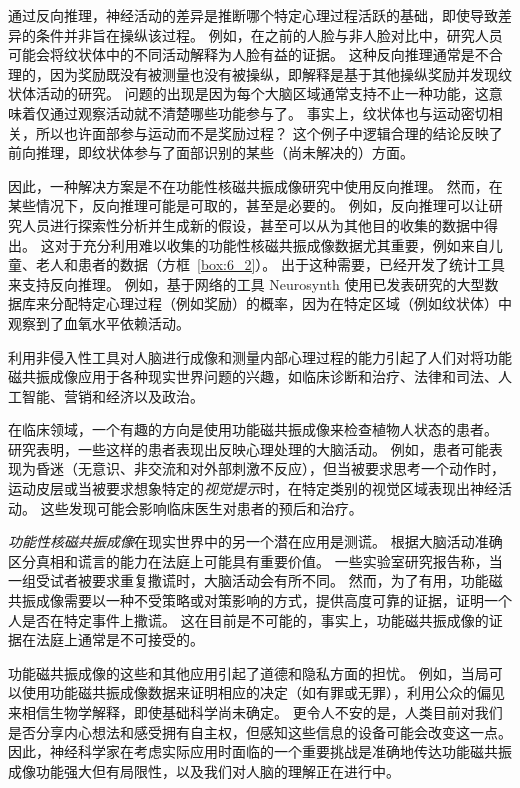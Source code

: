 通过反向推理，神经活动的差异是推断哪个特定心理过程活跃的基础，即使导致差异的条件并非旨在操纵该过程。 
例如，在之前的人脸与非人脸对比中，研究人员可能会将纹状体中的不同活动解释为人脸有益的证据。
这种反向推理通常是不合理的，因为奖励既没有被测量也没有被操纵，即解释是基于其他操纵奖励并发现纹状体活动的研究。
问题的出现是因为每个大脑区域通常支持不止一种功能，这意味着仅通过观察活动就不清楚哪些功能参与了。
事实上，纹状体也与运动密切相关，所以也许面部参与运动而不是奖励过程？
这个例子中逻辑合理的结论反映了前向推理，即纹状体参与了面部识别的某些（尚未解决的）方面。


因此，一种解决方案是不在功能性核磁共振成像研究中使用反向推理。
然而，在某些情况下，反向推理可能是可取的，甚至是必要的。
例如，反向推理可以让研究人员进行探索性分析并生成新的假设，甚至可以从为其他目的收集的数据中得出。
这对于充分利用难以收集的功能性核磁共振成像数据尤其重要，例如来自儿童、老人和患者的数据（方框~\ref{box:6_2}）。
出于这种需要，已经开发了统计工具来支持反向推理。
例如，基于网络的工具 Neurosynth 使用已发表研究的大型数据库来分配特定心理过程（例如奖励）的概率，因为在特定区域（例如纹状体）中观察到了血氧水平依赖活动。


\begin{proposition}[现实世界中的大脑成像] \label{box:6_2}
	
	\quad \quad 利用非侵入性工具对人脑进行成像和测量内部心理过程的能力引起了人们对将功能磁共振成像应用于各种现实世界问题的兴趣，如临床诊断和治疗、法律和司法、人工智能、营销和经济以及政治。
	
	\quad \quad 在临床领域，一个有趣的方向是使用功能磁共振成像来检查植物人状态的患者。
	研究表明，一些这样的患者表现出反映心理处理的大脑活动。
	例如，患者可能表现为昏迷（无意识、非交流和对外部刺激不反应），但当被要求思考一个动作时，运动皮层或当被要求想象特定的\textit{视觉提示}时，在特定类别的视觉区域表现出神经活动。
	这些发现可能会影响临床医生对患者的预后和治疗。
	
	\quad \quad \textit{功能性核磁共振成像}在现实世界中的另一个潜在应用是测谎。
	根据大脑活动准确区分真相和谎言的能力在法庭上可能具有重要价值。
	一些实验室研究报告称，当一组受试者被要求重复撒谎时，大脑活动会有所不同。
	然而，为了有用，功能磁共振成像需要以一种不受策略或对策影响的方式，提供高度可靠的证据，证明一个人是否在特定事件上撒谎。
	这在目前是不可能的，事实上，功能磁共振成像的证据在法庭上通常是不可接受的。
	
	\quad \quad 功能磁共振成像的这些和其他应用引起了道德和隐私方面的担忧。
	例如，当局可以使用功能磁共振成像数据来证明相应的决定（如有罪或无罪），利用公众的偏见来相信生物学解释，即使基础科学尚未确定。
	更令人不安的是，人类目前对我们是否分享内心想法和感受拥有自主权，但感知这些信息的设备可能会改变这一点。
	因此，神经科学家在考虑实际应用时面临的一个重要挑战是准确地传达功能磁共振成像功能强大但有局限性，以及我们对人脑的理解正在进行中。
	
\end{proposition}


